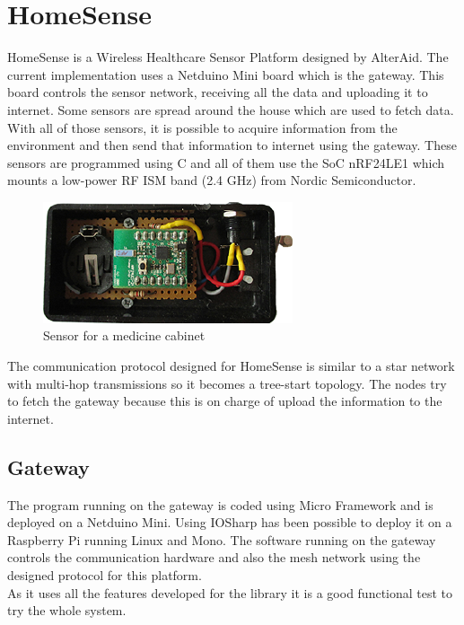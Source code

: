 \section{HomeSense}\label{S:IOEx-HomeSense}
HomeSense is a Wireless Healthcare Sensor Platform designed by AlterAid. The current implementation uses a Netduino Mini board which is the gateway. This board controls the sensor network, receiving all the data and uploading it to internet. Some sensors are spread around the house which are used to fetch data. With all of those sensors, it is possible to acquire information from the environment and then send that information to internet using the gateway. These sensors are programmed using C and all of them use the \gls{SoC} nRF24LE1 which mounts a low-power RF ISM band (2.4 GHz) from Nordic Semiconductor.
\begin{figure}[H]\begin{center}
 \centering
  \captionsetup{justification=centering}
  \includegraphics[scale=1]{pictures/examples/sensor}
  \caption{Sensor for a medicine cabinet\label{fig:IOEx-UART}}
\end{center}\end{figure}
The communication protocol designed for HomeSense is similar to a star network with multi-hop transmissions so it becomes a tree-start topology. The nodes try to fetch the gateway because this is on charge of upload the information to the internet.

\subsection{Gateway}\label{SS:IOEx-HomeSense-Gateway}
The program running on the gateway is coded using Micro Framework and is deployed on a Netduino Mini. Using IOSharp has been possible to deploy it on a Raspberry Pi running Linux and Mono. The software running on the gateway controls the communication hardware and also the mesh network using the designed protocol for this platform.
\\
As it uses all the features developed for the library it is a good functional test to try the whole system.

